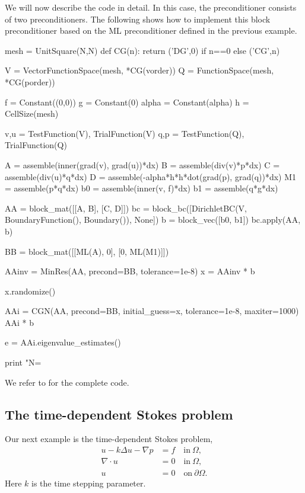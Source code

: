 We will now describe the code in detail.  In this case, the
preconditioner consists of two preconditioners.  The following shows
how to implement this block preconditioner
based on the ML preconditioner defined in the previous example.
\begin{python}
mesh = UnitSquare(N,N)
def CG(n):
    return ('DG',0) if n==0 else ('CG',n)

V = VectorFunctionSpace(mesh, *CG(vorder))
Q = FunctionSpace(mesh, *CG(porder))

f = Constant((0,0))
g = Constant(0)
alpha = Constant(alpha)
h = CellSize(mesh)

v,u = TestFunction(V), TrialFunction(V)
q,p = TestFunction(Q), TrialFunction(Q)

A  = assemble(inner(grad(v), grad(u))*dx)
B  = assemble(div(v)*p*dx)
C  = assemble(div(u)*q*dx)
D  = assemble(-alpha*h*h*dot(grad(p), grad(q))*dx)
M1 = assemble(p*q*dx)
b0 = assemble(inner(v, f)*dx)
b1 = assemble(q*g*dx)

AA = block_mat([[A, B],
                [C, D]])
bc = block_bc([DirichletBC(V, BoundaryFunction(), Boundary()), None])
b = block_vec([b0, b1])
bc.apply(AA, b)

BB = block_mat([[ML(A),  0],
                [0, ML(M1)]])


AAinv = MinRes(AA, precond=BB, tolerance=1e-8)
x = AAinv * b

x.randomize()

AAi = CGN(AA, precond=BB, initial_guess=x, tolerance=1e-8, maxiter=1000)
AAi * b

e = AAi.eigenvalue_estimates()

print "N=%
\end{python}
We refer to  for the complete code.

\subsection{The time-dependent Stokes problem}
Our next example is the time-dependent Stokes problem,
\begin{align}
u - k \Delta u - \nabla p &= f \quad \mbox{in} \ \Omega, \\
\nabla \cdot u &= 0 \quad \mbox{in} \  \Omega, \\
             u &= 0   \quad \mbox{on} \  \partial \Omega.
\end{align}
Here $k$ is the time stepping parameter.

